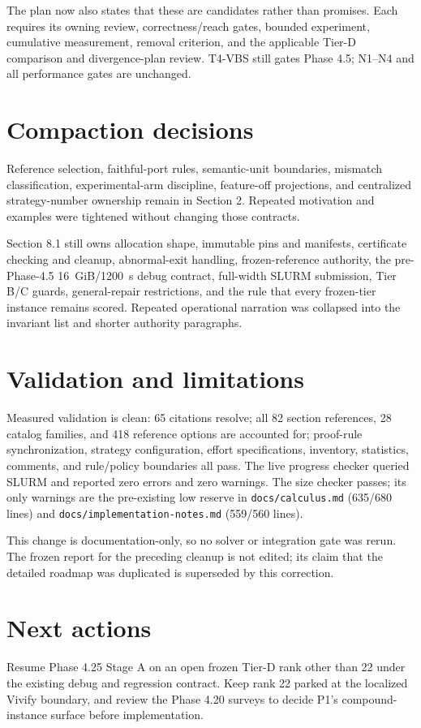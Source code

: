 \documentclass[11pt]{article}
\begin{document}
The plan now also states that these are candidates rather than promises.  Each
requires its owning review, correctness/reach gates, bounded experiment,
cumulative measurement, removal criterion, and the applicable Tier-D comparison
and divergence-plan review.  T4-VBS still gates Phase 4.5; N1--N4 and all
performance gates are unchanged.

\section{Compaction decisions}

Reference selection, faithful-port rules, semantic-unit boundaries, mismatch
classification, experimental-arm discipline, feature-off projections, and
centralized strategy-number ownership remain in Section 2.  Repeated
motivation and examples were tightened without changing those contracts.

Section 8.1 still owns allocation shape, immutable pins and manifests,
certificate checking and cleanup, abnormal-exit handling, frozen-reference
authority, the pre-Phase-4.5 16~GiB/1200~s debug contract, full-width SLURM
submission, Tier B/C guards, general-repair restrictions, and the rule that
every frozen-tier instance remains scored.  Repeated operational narration was
collapsed into the invariant list and shorter authority paragraphs.

\section{Validation and limitations}

Measured validation is clean: 65 citations resolve; all 82 section references,
28 catalog families, and 418 reference options are accounted for; proof-rule
synchronization, strategy configuration, effort specifications, inventory,
statistics, comments, and rule/policy boundaries all pass.  The live progress
checker queried SLURM and reported zero errors and zero warnings.  The size
checker passes; its only warnings are the pre-existing low reserve in
\texttt{docs/calculus.md} (635/680 lines) and
\texttt{docs/implementation-notes.md} (559/560 lines).

This change is documentation-only, so no solver or integration gate was rerun.
The frozen report for the preceding cleanup is not edited; its claim that the
detailed roadmap was duplicated is superseded by this correction.

\section{Next actions}

Resume Phase 4.25 Stage A on an open frozen Tier-D rank other than 22 under the
existing debug and regression contract.  Keep rank 22 parked at the localized
Vivify boundary, and review the Phase 4.20 surveys to decide P1's
compound-instance surface before implementation.
\end{document}
